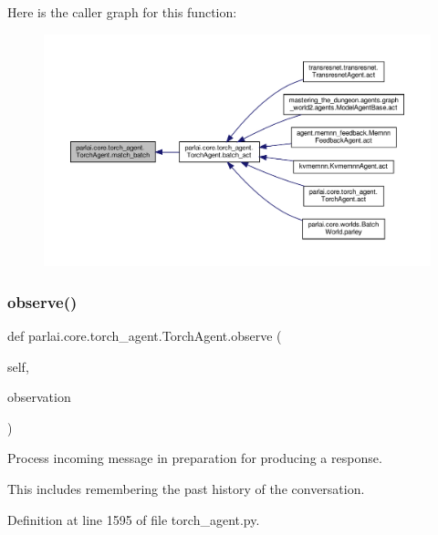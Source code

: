 Here is the caller graph for this function\+:
\nopagebreak
\begin{figure}[H]
\begin{center}
\leavevmode
\includegraphics[width=350pt]{classparlai_1_1core_1_1torch__agent_1_1TorchAgent_aba56b961d929e5c5b5da9cf8bd331502_icgraph}
\end{center}
\end{figure}
\mbox{\label{classparlai_1_1core_1_1torch__agent_1_1TorchAgent_a87b18f0d6ab11be3c49375af072d0d33}} 
\subsubsection{\texorpdfstring{observe()}{observe()}}
{\footnotesize\ttfamily def parlai.\+core.\+torch\+\_\+agent.\+Torch\+Agent.\+observe (\begin{DoxyParamCaption}\item[{}]{self,  }\item[{}]{observation }\end{DoxyParamCaption})}

\begin{DoxyVerb}Process incoming message in preparation for producing a response.

This includes remembering the past history of the conversation.
\end{DoxyVerb}
 

Definition at line 1595 of file torch\+\_\+agent.\+py.



